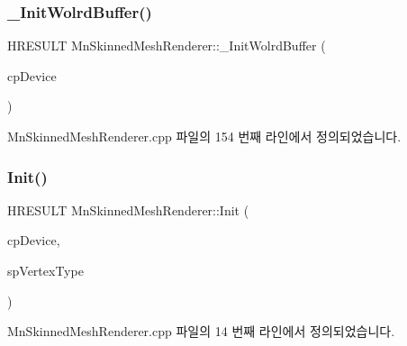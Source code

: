 \subsubsection{\texorpdfstring{\+\_\+\+Init\+Wolrd\+Buffer()}{\_InitWolrdBuffer()}}
{\footnotesize\ttfamily H\+R\+E\+S\+U\+LT Mn\+Skinned\+Mesh\+Renderer\+::\+\_\+\+Init\+Wolrd\+Buffer (\begin{DoxyParamCaption}\item[{const \hyperlink{namespace_m_n_l_a1eec210db8f309a4a9ac0d9658784c31}{C\+P\+D3\+D\+Device} \&}]{cp\+Device }\end{DoxyParamCaption})\hspace{0.3cm}{\ttfamily [private]}}



Mn\+Skinned\+Mesh\+Renderer.\+cpp 파일의 154 번째 라인에서 정의되었습니다.

\mbox{\label{class_m_n_l_1_1_mn_skinned_mesh_renderer_ac359436e68b305a342e34d400a496802}} 
\subsubsection{\texorpdfstring{Init()}{Init()}}
{\footnotesize\ttfamily H\+R\+E\+S\+U\+LT Mn\+Skinned\+Mesh\+Renderer\+::\+Init (\begin{DoxyParamCaption}\item[{const \hyperlink{namespace_m_n_l_a1eec210db8f309a4a9ac0d9658784c31}{C\+P\+D3\+D\+Device} \&}]{cp\+Device,  }\item[{const std\+::shared\+\_\+ptr$<$ \hyperlink{class_m_n_l_1_1_mn_custom_vertex_type}{Mn\+Custom\+Vertex\+Type} $>$ \&}]{sp\+Vertex\+Type }\end{DoxyParamCaption})}



Mn\+Skinned\+Mesh\+Renderer.\+cpp 파일의 14 번째 라인에서 정의되었습니다.

\mbox{\label{class_m_n_l_1_1_mn_skinned_mesh_renderer_a1c1c02fb793061ca3bb23b00f3c9f4e3}} 
